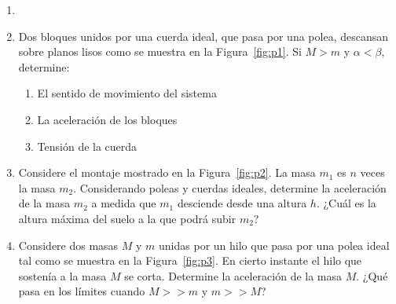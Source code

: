 \documentclass[letterpaper,11pt]{article}
\begin{document}
\vspace{-1cm}
\begin{enumerate}\setlength{\itemsep}{0.4cm}


\item[]

\item Dos bloques unidos por una cuerda ideal, que pasa por una polea, descansan sobre planos lisos como se muestra en la Figura~\ref{fig:p1}. Si $M>m$ y $\alpha <\beta$, determine:
    \begin{enumerate}
        \item El sentido de movimiento del sistema
        
        \item La aceleración de los bloques
        
        \item Tensión de la cuerda
    \end{enumerate}

\item Considere el montaje mostrado en la Figura~\ref{fig:p2}. La masa $m_1$ es $n$ veces la masa $m_2$. Considerando poleas y cuerdas ideales, determine la aceleración de la masa $m_2$ a medida que $m_1$ desciende desde una altura $h$. ¿Cuál es la altura máxima del suelo a la que podrá subir $m_2$?

\item Considere dos masas $M$ y $m$ unidas por un hilo que pasa por una polea ideal tal como se muestra en la Figura~\ref{fig:p3}.
En cierto instante el hilo que sostenía a la masa $M$ se corta. Determine la aceleración de la masa $M$.
¿Qué pasa en los límites cuando $M>>m$ y $m>>M$?


\end{enumerate}
\end{document}
